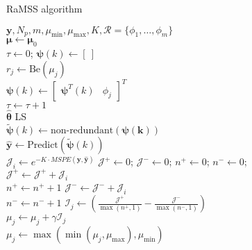 \documentclass[12pt,a4paper,titlepage,final]{book}
\theoremstyle{definition}
\begin{document}
\begin{algorithm}[htpb]
  \caption{RaMSS algorithm}\label{alg:RaMSS}
  $\bm{y},N_p,m,\mu_{\min},\mu_{\max},K,\mathscr{R}=\{\phi_{1},\dots,\phi_{m}\}$ \\
   {
     $ \bm{\mu} \gets \bm{\mu}_0$ \\
      {
         $\tau \gets 0$; $\bm{\psi}(k) \gets [\ ]$ \\ 
         {
           $r_j \gets \text{Be}(\mu_j)$ \\
            {
            $\bm{\psi}(k) \gets \begin{bmatrix} \bm{\psi}^T(k) & \phi_j \end{bmatrix}^T $ \\
            $\tau \gets \tau + 1$ \\
            }
         }
         $\hat{\bm{\theta}}$ \gets LS \\
         {
           $\tilde{\bm{\psi}}(k) \gets \text{non-redundant}(\bm{\psi(k)})$ \\
         }
         $\hat{\bm{y}} \gets \text{Predict}(\tilde{\bm{\psi}}(k))$ \\
         $\mathcal{J}_i \gets e^{-K\cdot MSPE(\bm{y},\bm{\hat{y}})} $
      }
      {
         $\mathcal{J}^{+} \gets 0$; $ \mathcal{J}^{-} \gets 0$; $n^{+} \gets 0$; $n^{-} \gets 0$; \\
         {
            {
               $\mathcal{J}^{+} \gets \mathcal{J}^{+} + \mathcal{J}_i$ \\
               $n^{+} \gets n^{+} + 1$
            } \Else
            {
               $\mathcal{J}^{-} \gets \mathcal{J}^{-} + \mathcal{J}_i$ \\
               $n^{-} \gets n^{-} + 1$
            }
          }
            $\mathcal{I}_j \gets \left( \frac{\mathcal{J}^{+}}{\max(n^+,1)} - \frac{\mathcal{J}^{-}}{\max(n^-,1)} \right) $ \\
         $\mu_j \gets \mu_j + \gamma \mathcal{I}_j$ \\
         $\mu_j \gets \max \left( \min(\mu_j, \mu_{\max}), \mu_{\min} \right) $ \\
         
      }
   }
\end{algorithm}%


\end{document}
